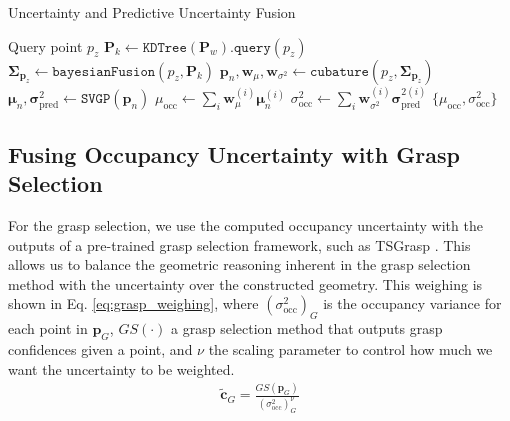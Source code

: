\begin{algorithm}
\caption{Uncertainty and Predictive Uncertainty Fusion}
\begin{algorithmic}[1]
\Require Query point $p_z$
\State $\mathbf{P}_k \gets \texttt{KDTree}(\mathbf{P}_w).\texttt{query}(p_z)$
\State $\mathbf{\Sigma}_{\mathbf{p}_z} \gets \texttt{bayesianFusion}(p_z, \mathbf{P}_k)$ 
\State $\mathbf{p}_n, \boldsymbol{w}_\mu, \boldsymbol{w}_{\sigma^2} \gets \texttt{cubature}(p_z, \mathbf{\Sigma}_{\mathbf{p}_z})$ 
\State $\boldsymbol{\mu}_n, \boldsymbol{\sigma}_\text{pred}^2 \gets \texttt{SVGP}\left(\mathbf{p}_n\right)$ 
\State $\mu_\text{occ} \gets \sum_i \boldsymbol{w}_\mu^{(i)} \boldsymbol{\mu}_n^{(i)}$
\State $\sigma^2_\text{occ} \gets \sum_i \boldsymbol{w}_{\sigma^2}^{(i)} \boldsymbol{\sigma}_\text{pred}^{2(i)}$
\State \Return $\{\mu_\text{occ}, \sigma_\text{occ}^2\}$
\end{algorithmic}
\label{alg:fusion}
\end{algorithm}



\subsection{Fusing Occupancy Uncertainty with Grasp Selection}\label{ss:grasp_selection}
For the grasp selection, we use the computed occupancy uncertainty with the outputs of a pre-trained grasp selection framework, such as TSGrasp \cite{player_real-time_2023}.
This allows us to balance the geometric reasoning inherent in the grasp selection method with the uncertainty over the constructed geometry.
This weighing is shown in Eq. \eqref{eq:grasp_weighing}, where $\left(\sigma_\text{occ}^2\right)_G$ is the occupancy variance for each point in $\mathbf{p}_G$, $GS\left(\cdot\right)$ a grasp selection method that outputs grasp confidences given a point, and $\nu$ the scaling parameter to control how much we want the uncertainty to be weighted.
\begin{gather}
    \tilde{\mathbf{c}}_G = \frac{GS\left(\mathbf{p}_G\right)}{\left(\sigma_\text{occ}^2\right)_G^\nu} \label{eq:grasp_weighing}
\end{gather}

